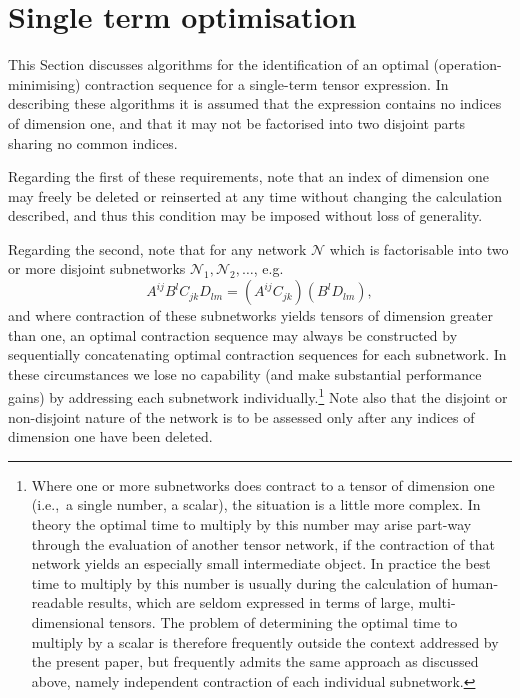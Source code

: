\documentclass[aps,pre,reprint,superscriptaddress,amsfonts,amsmath,showpacs,nofootinbib,floatfix]{revtex4-1}
\newcommand{\mc}[1]{\mathcal{#1}}
\begin{document}
\section{Single term optimisation\label{sec:singleterm}}

This Section discusses algorithms for the identification of an optimal (operation-minimising) contraction sequence for a single-term tensor expression. In describing these algorithms it is assumed that the expression contains no indices of dimension one, and that it may not be factorised into two disjoint parts sharing no common indices.

Regarding the first of these requirements, note that an index of dimension one may freely be deleted or reinserted at any time without changing the calculation described, and thus this condition may be imposed without loss of generality. 

Regarding the second, note that
for any network $\mc{N}$ which is factorisable into two or more disjoint subnetworks $\mc{N}_1,\mc{N}_2,\ldots$, e.g.
\begin{equation}
A^{ij}B^{l}C_{jk}D_{lm} = \left(A^{ij}C_{jk}\right)\left(B^l D_{lm}\right),\label{eq:disjoint}
\end{equation} 
and where contraction of these subnetworks yields tensors of dimension greater than one,
an optimal contraction sequence may always be constructed by sequentially concatenating optimal contraction sequences for each subnetwork. In these circumstances we lose no capability (and make substantial performance gains) by addressing each subnetwork individually.\footnote{\label{fn:scalar}Where one or more subnetworks does contract to a tensor of dimension one (i.e.,~a single number, a scalar), the situation is a little more complex. In theory the optimal time to multiply by this number may arise part-way through the evaluation of another tensor network, if the contraction of that network yields an especially small intermediate object. In practice the best time to multiply by this number is usually during the calculation of human-readable results, which are seldom expressed in terms of large, multi-dimensional tensors. The problem of determining the optimal time to multiply by a scalar is therefore frequently outside the context addressed by the present paper, but frequently admits the same approach as discussed above, namely independent contraction of each individual subnetwork.}
Note also that the disjoint or non-disjoint nature of the network is to be assessed only after any indices of dimension one have been deleted.
\end{document}
